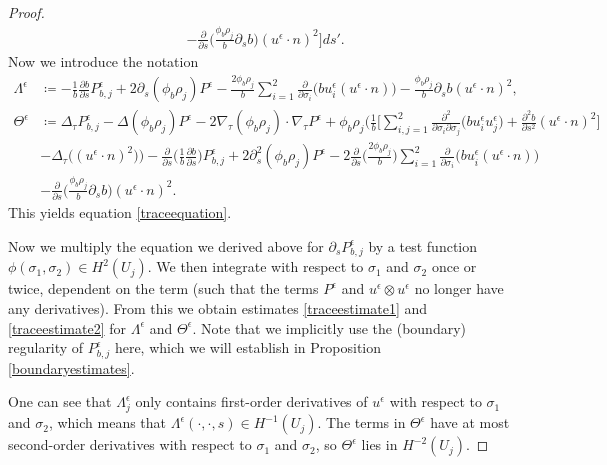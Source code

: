 \documentclass[12pt,a4paper]{article}
\theoremstyle{definition}
\theoremstyle{remark}
\numberwithin{equation}{section}
\begin{document}
\begin{proof}
\begin{align*}
&- \frac{\partial}{\partial s} \bigg( \frac{\phi_b \rho_j}{b} \partial_s b \bigg) (u^\epsilon \cdot n)^2 \bigg] ds'. 
\end{align*}
\endgroup
Now we introduce the notation
\begin{align*}
\Lambda^\epsilon &\coloneqq -\frac{1}{b} \frac{\partial b}{\partial s} P^\epsilon_{b,j} + 2 \partial_s (\phi_b \rho_j) P^\epsilon - \frac{2 \phi_b \rho_j}{b} \sum_{i=1}^2 \frac{\partial}{\partial \sigma_i} \big( b u^\epsilon_i (u^\epsilon \cdot n) \big) - \frac{\phi_b \rho_j}{b} \partial_s b (u^\epsilon \cdot n)^2, \\
\Theta^\epsilon &\coloneqq \Delta_\tau P^\epsilon_{b,j} - \Delta (\phi_b \rho_j) P^\epsilon - 2 \nabla_\tau (\phi_b \rho_j) \cdot \nabla_\tau P^\epsilon + \phi_b \rho_j \bigg( \frac{1}{b} \bigg[ \sum_{i,j=1}^2 \frac{\partial^2}{\partial \sigma_i \partial \sigma_j} \big( b u^\epsilon_i u^\epsilon_j \big)  + \frac{\partial^2 b}{\partial s^2}  (u^\epsilon \cdot n)^2  \bigg]  \\
&- \Delta_\tau \big( (u^\epsilon \cdot n)^2 \big)  \bigg) - \frac{\partial}{\partial s} \bigg( \frac{1}{b} \frac{\partial b}{\partial s} \bigg) P^\epsilon_{b,j} + 2 \partial_s^2 (\phi_b \rho_j) P^\epsilon - 2 \frac{\partial}{\partial s} \bigg( \frac{2 \phi_b \rho_j}{b} \bigg) \sum_{i=1}^2 \frac{\partial}{\partial \sigma_i} \big( b u^\epsilon_i (u^\epsilon \cdot n) \big) \\
&- \frac{\partial}{\partial s} \bigg( \frac{\phi_b \rho_j}{b} \partial_s b \bigg) (u^\epsilon \cdot n)^2.
\end{align*}
This yields equation \eqref{traceequation}.

Now we multiply the equation we derived above for $\partial_s P^\epsilon_{b,j}$ by a test function $\phi ( \sigma_1,\sigma_2) \in H^2 (U_j)$. We then integrate with respect to $\sigma_1$ and $\sigma_2$ once or twice, dependent on the term (such that the terms $P^\epsilon$ and $u^\epsilon \otimes u^\epsilon$ no longer have any derivatives). From this we obtain estimates \eqref{traceestimate1} and \eqref{traceestimate2} for $\Lambda^\epsilon$ and $\Theta^\epsilon$. Note that we implicitly use the (boundary) regularity of $P^\epsilon_{b,j}$ here, which we will establish in Proposition \ref{boundaryestimates}.

One can see that $\Lambda^\epsilon_j$ only contains first-order derivatives of $u^\epsilon$ with respect to $\sigma_1$ and $\sigma_2$, which means that $\Lambda^\epsilon (\cdot, \cdot, s) \in H^{-1} (U_j)$. The terms in $\Theta^\epsilon$ have at most second-order derivatives with respect to $\sigma_1$ and $\sigma_2$, so $\Theta^\epsilon$ lies in $H^{-2} (U_j)$.
\end{proof}
\end{document}
